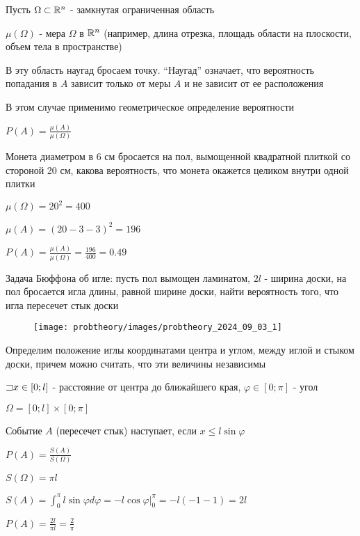 \documentclass[12pt]{article}
\begin{document}
    Пусть $\Omega \subset \mathbb{R}^n$ - замкнутая ограниченная область

    $\mu(\Omega)$ - мера $\Omega$ в $\mathbb{R}^n$ (например, длина отрезка, площадь области на плоскости, объем тела в пространстве)

    В эту область наугад бросаем точку. \enquote{Наугад} означает, что вероятность попадания в $A$ зависит только от меры $A$ и не зависит от ее расположения

    В этом случае применимо геометрическое определение вероятности

    $P(A) = \frac{\mu(A)}{\mu(\Omega)}$

     Монета диаметром в 6 см бросается на пол, вымощенной квадратной плиткой со стороной 20 см, какова вероятность,
    что монета окажется целиком внутри одной плитки

    $\mu(\Omega) = 20^2 = 400$

    $\mu(A) = (20 - 3 - 3)^2 = 196$

    $P(A) = \frac{\mu(A)}{\mu(\Omega)} = \frac{196}{400} = 0.49$

    \hypertarget{buffonsproblem}{}

     Задача Бюффона об игле: пусть пол вымощен ламинатом, $2l$ - ширина доски, на пол бросается игла длины, равной ширине доски,
    найти вероятность того, что игла пересечет стык доски

    \smallvspace

    \begin{minipage}{\linewidth}
        \begin{wrapfigure}{r}{0pt}
            \texttt{[image: probtheory/images/probtheory\_2024\_09\_03\_1]}
        \end{wrapfigure}

        Определим положение иглы координатами центра и углом, между иглой и стыком доски, причем можно считать, что эти величины независимы

        $\mathord{\sqsupset} x \in [0; l]$ - расстояние от центра до ближайшего края, $\varphi \in [0; \pi]$ - угол

        $\Omega = [0; l] \times [0; \pi]$

        Событие $A$ (пересечет стык) наступает, если $x \leq l \sin \varphi$

        $P(A) = \frac{S(A)}{S(\Omega)}$

        $S(\Omega) = \pi l$

        $S(A) = \int_0^\pi l \sin \varphi d\varphi = -l \cos \varphi \Big|_0^\pi = -l (-1 - 1) = 2l$

        $P(A) = \frac{2l}{\pi l} = \frac{2}{\pi}$
    \end{minipage}
\end{document}
